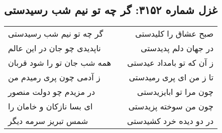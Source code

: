 \begin{center}
\section*{غزل شماره ۳۱۵۲: گر چه تو نیم شب رسیدستی}
\label{sec:3152}
\begin{longtable}{l p{0.5cm} r}
گر چه تو نیم شب رسیدستی
&&
صبح عشاق را کلیدستی
\\
ناپدیدی چو جان در این عالم
&&
در جهان دلم پدیدستی
\\
همه شب جان تو را شود قربان
&&
ز آن که تو بامداد عیدستی
\\
ز آدمی چون پری رمیدم من
&&
تا ز من ای پری رمیدستی
\\
در مزیدم چو دولت منصور
&&
چون مرا تو ابایزیدستی
\\
ای بسا نازکان و خامان را
&&
چون من سوخته پزیدستی
\\
شمس تبریز سرمه دیگر
&&
در دو دیده خرد کشیدستی
\\
\end{longtable}
\end{center}
